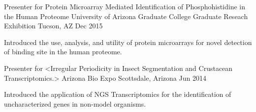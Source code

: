 

\begin{cventries}

  \cventry
    {Presenter for Protein Microarray Mediated Identification of Phosphohistidine in the Human Proteome} %
    {University of Arizona Graduate College Graduate Reseach Exhibition} %
    {Tucson, AZ} %
    {Dec 2015} %
    {
      \begin{cvitems} %
        \item {Introduced the use, analysis, and utility of protein microarrays for novel detection of binding site in the human proteome.}
      \end{cvitems}
    }

  \cventry
    {Presenter for <Irregular Periodicity in Insect Segmentation and Crustacean Transcriptomics.>} %
    {Arizona Bio Expo} %
    {Scottsdale, Arizona} %
    {Jun 2014} %
    {
      \begin{cvitems} %
        \item {Introduced the application of NGS Transcriptomics for the identification of uncharacterized genes in non-model organisms.}
      \end{cvitems}
    }

\end{cventries}
